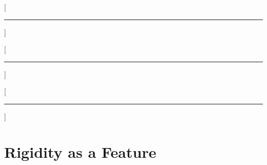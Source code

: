 \newlength{\headersep}
\setlength{\headersep}{2em}
\newcommand{\headerdelim}{}
\titleformat{\chapter}[frame]{\Large}{\filright\enspace{\Large \chaptertitlename~\thechapter}\enspace}{2cm}{\LARGE\bfseries\filcenter}
\titleformat{\section}[block]{\filcenter\Large}{\thesection\headerdelim}{\headersep}{\bfseries}[\rule{\titlewidth}{0.8pt}]
\titleformat{\subsection}[block]{\filcenter\large}{\thesubsection}{\headersep}{\bfseries}[\rule{\titlewidth}{0.5pt}]
\titleformat{\subsubsection}[block]{\filcenter\small}{\thesubsubsection}{\headersep}{\bfseries}[\rule{\titlewidth}{0.3pt}]


\tableofcontents
\newpage

\setlength{\parskip}{\defparskip}

\setcounter{footnote}{0}
\setcounter{section}{1}

\renewcommand{\thesection}{}
\renewcommand{\thesubsection}{}
\renewcommand{\thesubsubsection}{}



\mainmatter

\renewcommand{\headerdelim}{.}
\renewcommand{\thesection}{\arabic{section}}
\renewcommand{\thesubsection}{\thesection.\arabic{subsection}}
\renewcommand{\thesubsubsection}{\thesection.\thesubsection.\roman{subsubsection}}
\renewcommand{\chaptermark}[1]{\markboth{\chaptertitlename~\thechapter.\ #1}{}}
\renewcommand{\sectionmark}[1]{\markright{#1}}
\renewcommand{\thefootnote}{\arabic{footnote}}

\part{Rigidity as a Feature}



